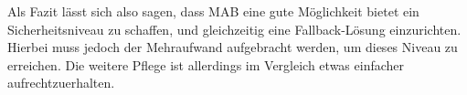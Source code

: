 \documentclass[conference]{IEEEtran}
\begin{document}
Als Fazit lässt sich also sagen, dass MAB eine gute Möglichkeit bietet ein Sicherheitsniveau zu schaffen, und gleichzeitig eine Fallback-Lösung einzurichten. Hierbei muss jedoch der Mehraufwand aufgebracht werden, um dieses Niveau zu erreichen. Die weitere Pflege ist allerdings im Vergleich etwas einfacher aufrechtzuerhalten. %

%

\vspace{1em}


\end{document}
